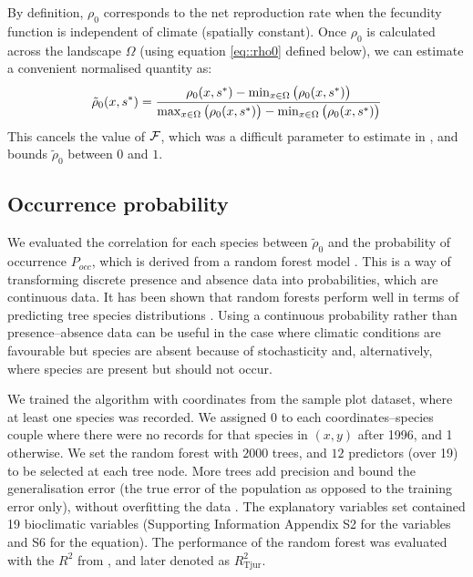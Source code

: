 By definition, $ \rho_0 $ corresponds to the net reproduction rate when the fecundity function is independent of climate (\ie spatially constant). Once $ \rho_0 $ is calculated across the landscape $ \Omega $ (using equation \eqref{eq::rho0} defined below), we can estimate a convenient normalised quantity as:
\begin{equation} \label{eq::rho0_scaled}
	\tilde \rho_0(x, {s}^{*}) = \frac{\rho_0(x, {s}^{*}) - \min_{x \in \Omega} \big(\rho_0(x, {s}^{*}) \big)}{\max_{x \in \Omega} \big(\rho_0(x, {s}^{*}) \big) - \min_{x \in \Omega} \big(\rho_0(x, {s}^{*}) \big)}
\end{equation}
This cancels the value of $ \mathcal{F} $, which was a difficult parameter to estimate in \citet{Purves2008}, and bounds $ \tilde \rho_0 $ between $ 0 $ and $ 1 $.

\subsection{Occurrence probability}
We evaluated the correlation for each species between $ \tilde \rho_0 $ and the probability of occurrence $ P_{occ} $, which is derived from a random forest model \citep[R package]{randomForest}. This is a way of transforming discrete presence and absence data into probabilities, which are continuous data. It has been shown that random forests perform well in terms of predicting tree species distributions \citep{Prasad2006}. Using a continuous probability rather than presence--absence data can be useful in the case where climatic conditions are favourable but species are absent because of stochasticity and, alternatively, where species are present but should not occur.

We trained the algorithm with coordinates from the sample plot dataset, where at least one species was recorded. We assigned 0 to each coordinates--species couple where there were no records for that species in $ (x, y) $ after 1996, and 1 otherwise. We set the random forest with $ 2000 $ trees, and $ 12 $ predictors (over 19) to be selected at each tree node. More trees add precision and bound the generalisation error (\ie the true error of the population as opposed to the training error only), without overfitting the data \citep{Prasad2006}. The explanatory variables set contained 19 bioclimatic variables (Supporting Information Appendix S2 for the variables and S6 for the equation). The performance of the random forest was evaluated with the $ R^2 $ from \citet{Tjur2009}, and later denoted as $ R_{\text{Tjur}}^2 $.

